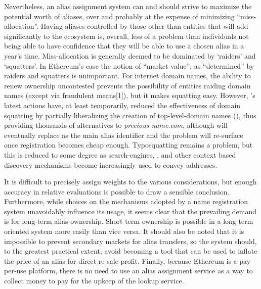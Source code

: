 \documentclass[10pt,a4paper]{article}
\begin{document}
Nevertheless, an alias assignment system can and should strive to maximize the potential worth of aliases, over and probably at the expense of minimizing ``miss-allocation''. Having aliases controlled by those other than entities that will add significantly to the ecosystem is, overall, less of a problem than individuals not being able to have confidence that they will be able to use a chosen alias in a year's time. Miss-allocation is generally deemed to be dominated by `raiders' and `squatters'. In Ethereum's case the notion of ``market value'', as ``determined'' by raiders and squatters is unimportant. For internet domain names, the ability to renew ownership uncontested prevents the possibility of entities raiding domain names (except via fraudulent means[1]), but it makes squatting easy. However, \icann's latest actions have, at least temporarily, reduced the effectiveness of domain squatting by partially liberalizing the creation of top-level-domain names (\tlds), thus providing thousands of alternatives to {\it precious-name.com}, although \tlds will eventually replace \slds as the main alias identifier and the problem will re-surface once \tld registration becomes cheap enough. Typosquatting remains a problem, but this is reduced to some degree as search-engines, \qrcodes, \nfc and other context based discovery mechanisms become increasingly used to convey addresses. 

It is difficult to precisely assign weights to the various considerations, but enough accuracy in relative evaluations is possible to draw a sensible conclusion. Furthermore, while choices on the mechanisms adopted by a name registration system unavoidably influence its usage, it seems clear that the prevailing demand is for long-term alias ownership. Short term ownership is possible in a long term oriented system more easily than vice versa. It should also be noted that it is impossible to prevent secondary markets for alias transfers, so the system should, to the greatest practical extent, avoid becoming a tool that can be used to inflate the price of an alias for direct re-sale profit. Finally, because Ethereum is a pay-per-use platform, there is no need to use an alias assignment service as a way to collect money to pay for the upkeep of the lookup service. 
\end{document}
